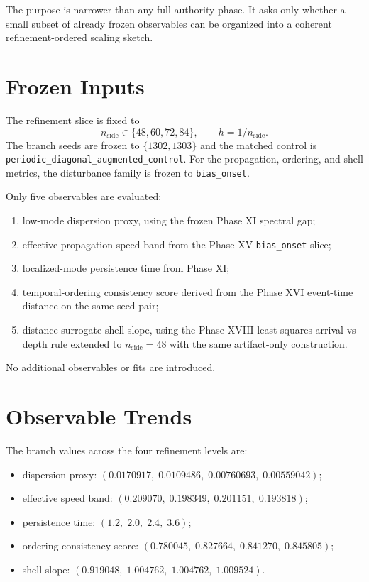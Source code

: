 \documentclass[11pt]{article}
\begin{document}
The purpose is narrower than any full authority phase. It asks only whether a small subset of already frozen observables can be organized into a coherent refinement-ordered scaling sketch.

\section{Frozen Inputs}

The refinement slice is fixed to
\[
n_{\mathrm{side}} \in \{48,60,72,84\},
\qquad
h = 1/n_{\mathrm{side}}.
\]
The branch seeds are frozen to $\{1302,1303\}$ and the matched control is \texttt{periodic\_diagonal\_augmented\_control}. For the propagation, ordering, and shell metrics, the disturbance family is frozen to \texttt{bias\_onset}.

Only five observables are evaluated:
\begin{enumerate}
\item low-mode dispersion proxy, using the frozen Phase XI spectral gap;
\item effective propagation speed band from the Phase XV \texttt{bias\_onset} slice;
\item localized-mode persistence time from Phase XI;
\item temporal-ordering consistency score derived from the Phase XVI event-time distance on the same seed pair;
\item distance-surrogate shell slope, using the Phase XVIII least-squares arrival-vs-depth rule extended to $n_{\mathrm{side}}=48$ with the same artifact-only construction.
\end{enumerate}

No additional observables or fits are introduced.

\section{Observable Trends}

The branch values across the four refinement levels are:
\begin{itemize}
\item dispersion proxy: $(0.0170917,\;0.0109486,\;0.00760693,\;0.00559042)$;
\item effective speed band: $(0.209070,\;0.198349,\;0.201151,\;0.193818)$;
\item persistence time: $(1.2,\;2.0,\;2.4,\;3.6)$;
\item ordering consistency score: $(0.780045,\;0.827664,\;0.841270,\;0.845805)$;
\item shell slope: $(0.919048,\;1.004762,\;1.004762,\;1.009524)$.
\end{itemize}
\end{document}
